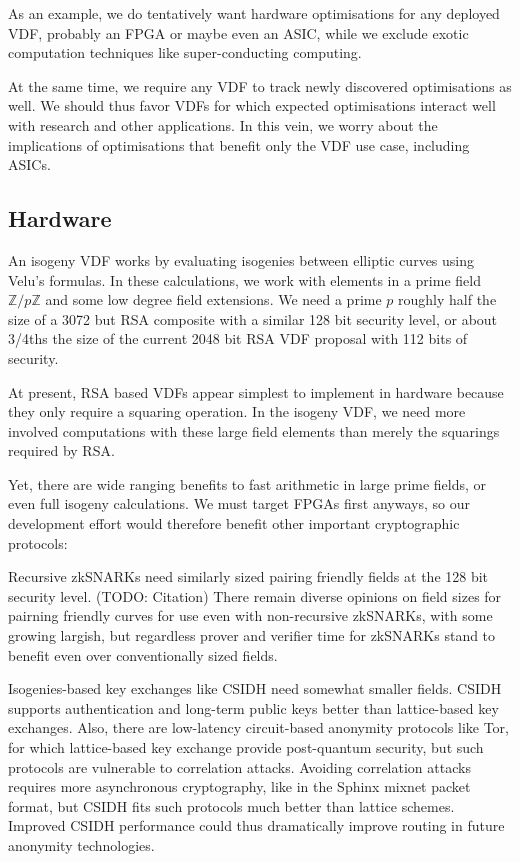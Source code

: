 \documentclass{article}
\newcommand{\Z}{\mathbb{Z}}
\begin{document}
As an example, we do tentatively want hardware optimisations for
any deployed VDF, probably an FPGA or maybe even an ASIC, while we
exclude exotic computation techniques like super-conducting computing.

At the same time, we require any VDF to track newly discovered
optimisations as well.  We should thus favor VDFs for which expected
optimisations interact well with research and other applications.
In this vein, we worry about the implications of optimisations that
benefit only the VDF use case, including ASICs.

\subsection{Hardware}

An isogeny VDF works by evaluating isogenies between elliptic curves
using Velu's formulas.  In these calculations, we work with elements
in a prime field $\Z/p\Z$ and some low degree field extensions. 
We need a prime $p$ roughly half the size of a 3072 but RSA composite
with a similar 128 bit security level, or about 3/4ths the size of the
current 2048 bit RSA VDF proposal with 112 bits of security.

At present, RSA based VDFs appear simplest to implement in hardware
because they only require a squaring operation. %
In the isogeny VDF, we need more involved computations with these
large field elements than merely the squarings required by RSA. 

Yet, there are wide ranging benefits to fast arithmetic in large
prime fields, or even full isogeny calculations.  We must target
FPGAs first anyways, so our development effort would therefore
benefit other important cryptographic protocols:
 
Recursive zkSNARKs need similarly sized pairing friendly fields at
the 128 bit security level.  (TODO: Citation)
There remain diverse opinions on field sizes for pairning friendly
curves for use even with non-recursive zkSNARKs, with some growing
largish, but regardless prover and verifier time for zkSNARKs stand
to benefit even over conventionally sized fields.  

Isogenies-based key exchanges like CSIDH \cite{10.1007/978-3-030-03332-3_15} need somewhat
smaller fields.  CSIDH supports authentication and long-term public
keys better than lattice-based key exchanges. 
Also, there are low-latency circuit-based anonymity protocols like Tor,
for which lattice-based key exchange provide post-quantum security,
but such protocols are vulnerable to correlation attacks. 
Avoiding correlation attacks requires more asynchronous cryptography,
like in the Sphinx mixnet packet format, but CSIDH fits such protocols
much better than lattice schemes.  Improved CSIDH performance could
thus dramatically improve routing in future anonymity technologies.
\end{document}
